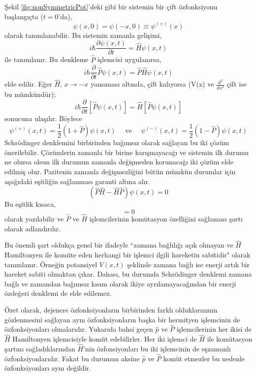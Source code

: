 \documentclass[00_kitap.tex]{subfiles}
\begin{document}
Şekil \ref{fig:nonSymmetricPot}'deki gibi bir sistemin bir çift özfonksiyonu başlangıçta ($t=0$'da),
\begin{equation}
\psi(x, 0)=\psi(-x, 0) \equiv \psi^{(+)}(x)
\end{equation}
olarak tanımlanabilir. Bu sistemin zamanla gelişimi,
\begin{equation}
i \hbar \frac{\partial \psi(x, t)}{\partial t}= \hat H \psi(x, t)
\end{equation}
ile tanımlanır. Bu denkleme $\hat P$ işlemcisi uygulanırsa,
\begin{equation}
i \hbar \frac{\partial}{\partial t} \hat P \psi(x, t)= \hat P  \hat H \psi(x, t)
\end{equation}
elde edilir. Eğer $\hat H$, $x \rightarrow -x$ yansıması altında, çift kalıyorsa (V(x) ve $\frac{d^2}{dx^2}$ çift ise bu mümkündür);
\begin{equation}
i \hbar \frac{\partial}{\partial t}[ \hat P \psi(x, t)]= \hat H[ \hat P \psi(x, t)]
\end{equation}
sonucuna ulaşılır. Böylece
\begin{equation}
\psi^{(+)}(x, t)=\frac{1}{2}(1+ \hat P) \psi(x, t) \quad \text{ ve } \quad \psi^{(-)}(x, t)=\frac{1}{2}(1- \hat P) \psi(x, t) 
\end{equation}
Schrödinger denklemini birbirinden bağımsız olarak sağlayan bu iki çözüm önerilebilir. Çözümlerin zamanla bir birine karışmayacağı ve sistemin ilk durumu ne olursa olsun ilk durumun zamanla değişmeden korunacağı iki çözüm elde edilmiş olur.
Paritenin zamanla değişmezliğini bütün mümkün durumlar için aşağıdaki eşitliğin sağlanması garanti altına alır. 
\begin{equation}
( \hat P  \hat H-  \hat H  \hat P) \psi(x, t)=0
\end{equation}
Bu eşitlik kısaca,
\begin{equation}
[ \hat P,  \hat H]=0
\end{equation}
olarak yazılabilir ve $\hat P$ ve $\hat H$ işlemcilerinin komütasyon özelliğini sağlaması şartı olarak adlandırılır.

Bu önemli şart oldukça genel bir ifadeyle ``zamana bağlılığı açık olmayan ve $\hat H$ Hamiltonyen ile komüte eden herhangi bir işlemci ilgili hareketin sabitidir" olarak tanımlanır. Örneğin potansiyel $V(x,t)$ şeklinde zamana bağlı ise enerji artık bir hareket sabiti olmaktan çıkar. Dahası, bu durumda Schrödinger denklemi zamana bağlı ve zamandan bağımsız kısım olarak ikiye ayrılamayacağından bir enerji özdeğeri denklemi de elde edilemez.

Özet olarak, dejenere özfonksiyonların birbirinden farklı olduklarınının gözlenmesini sağlayan aynı özfonksiyonların başka bir hermityen işlemcinin de özfonksiyonları olmalarıdır. Yukarıda bahsi geçen  $\hat p$ ve $\hat P$ işlemcilerinin her ikisi de $\hat H$ Hamiltonyen işlemcisiyle komüt edebilirler. Her iki işlemci de $\hat H$ ile komütasyon şartını sağladıklarından $\hat H$'nin özfonsiyonları bu iki işlemcinin de eşzamanlı özfonksiyonlarıdır. Fakat bu durumun aksine $\hat p$ ve $\hat P$ komüt etmezler bu nedenle özfonksiyonları aynı değildir.




\BolumKaynakcaBitir
\end{document}
